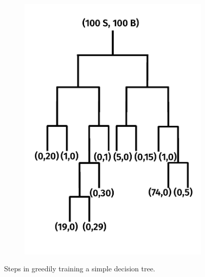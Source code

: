 \begin{figure}[]
\begin{center}
\begin{subfigure}[t]{0.32\textwidth}
            \includegraphics[width=\textwidth]{figures/toptagging/bdt/tree2.pdf}
        \end{subfigure}
        \caption{Steps in greedily training a simple decision tree.}
        \label{fig:jets:dt}
    \end{center}
\end{figure}

